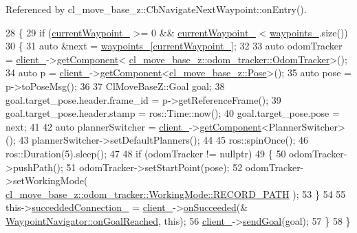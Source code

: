 Referenced by cl\+\_\+move\+\_\+base\+\_\+z\+::\+Cb\+Navigate\+Next\+Waypoint\+::on\+Entry().


\begin{DoxyCode}
28 \{
29   \textcolor{keywordflow}{if} (\hyperlink{classcl__move__base__z_1_1WaypointNavigator_a82859e418592c2392c20a2d11b9836eb}{currentWaypoint\_} >= 0 && \hyperlink{classcl__move__base__z_1_1WaypointNavigator_a82859e418592c2392c20a2d11b9836eb}{currentWaypoint\_} < 
      \hyperlink{classcl__move__base__z_1_1WaypointNavigator_a727f6a73e15ff5dc6bb3ffdf52c3d832}{waypoints\_}.size())
30   \{
31     \textcolor{keyword}{auto} &next = \hyperlink{classcl__move__base__z_1_1WaypointNavigator_a727f6a73e15ff5dc6bb3ffdf52c3d832}{waypoints\_}[\hyperlink{classcl__move__base__z_1_1WaypointNavigator_a82859e418592c2392c20a2d11b9836eb}{currentWaypoint\_}];
32 
33     \textcolor{keyword}{auto} odomTracker = \hyperlink{classcl__move__base__z_1_1WaypointNavigator_afc5ad5c5d15f41437286b8fca1d3a324}{client\_}->\hyperlink{classsmacc_1_1ISmaccClient_adef78db601749ca63c19e74a27cb88cc}{getComponent}<
      \hyperlink{classcl__move__base__z_1_1odom__tracker_1_1OdomTracker}{cl\_move\_base\_z::odom\_tracker::OdomTracker}>();
34     \textcolor{keyword}{auto} p = \hyperlink{classcl__move__base__z_1_1WaypointNavigator_afc5ad5c5d15f41437286b8fca1d3a324}{client\_}->\hyperlink{classsmacc_1_1ISmaccClient_adef78db601749ca63c19e74a27cb88cc}{getComponent}<\hyperlink{classcl__move__base__z_1_1Pose}{cl\_move\_base\_z::Pose}>();
35     \textcolor{keyword}{auto} pose = p->toPoseMsg();
36 
37     ClMoveBaseZ::Goal goal;
38     goal.target\_pose.header.frame\_id = p->getReferenceFrame();
39     goal.target\_pose.header.stamp = ros::Time::now();
40     goal.target\_pose.pose = next;
41 
42     \textcolor{keyword}{auto} plannerSwitcher = \hyperlink{classcl__move__base__z_1_1WaypointNavigator_afc5ad5c5d15f41437286b8fca1d3a324}{client\_}->\hyperlink{classsmacc_1_1ISmaccClient_adef78db601749ca63c19e74a27cb88cc}{getComponent}<PlannerSwitcher>();
43     plannerSwitcher->setDefaultPlanners();
44 
45     ros::spinOnce();
46     ros::Duration(5).sleep();
47 
48     \textcolor{keywordflow}{if} (odomTracker != \textcolor{keyword}{nullptr})
49     \{
50       odomTracker->pushPath();
51       odomTracker->setStartPoint(pose);
52       odomTracker->setWorkingMode(
      \hyperlink{namespacecl__move__base__z_1_1odom__tracker_ac46b05813b2791604f6cd0a39ace3ef8a023bc3adf68871ef7a0c616765ac80a7}{cl\_move\_base\_z::odom\_tracker::WorkingMode::RECORD\_PATH}
      );
53     \}
54 
55     this->\hyperlink{classcl__move__base__z_1_1WaypointNavigator_a6e32b1d6cae56963187d0965de251108}{succeddedConnection\_} = \hyperlink{classcl__move__base__z_1_1WaypointNavigator_afc5ad5c5d15f41437286b8fca1d3a324}{client\_}->\hyperlink{classsmacc_1_1client__bases_1_1SmaccActionClientBase_af6d77c27d21b2e4f621f53c5f1df088b}{onSucceeded}(&
      \hyperlink{classcl__move__base__z_1_1WaypointNavigator_ae10ba80b7e46b62096cac96609f66893}{WaypointNavigator::onGoalReached}, \textcolor{keyword}{this});
56     \hyperlink{classcl__move__base__z_1_1WaypointNavigator_afc5ad5c5d15f41437286b8fca1d3a324}{client\_}->\hyperlink{classsmacc_1_1client__bases_1_1SmaccActionClientBase_a9c47a5094ac8afb01680307fe5eca922}{sendGoal}(goal);
57   \}
58 \}
\end{DoxyCode}
